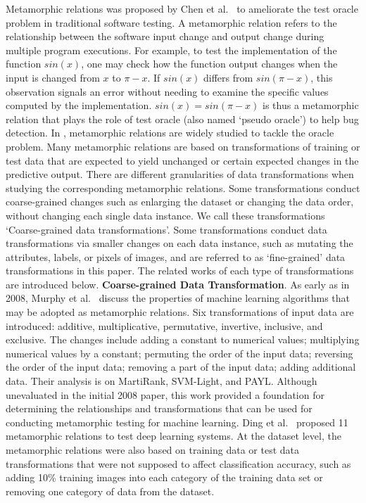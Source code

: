 \label{sec:metamorphicrelations}
Metamorphic relations was proposed by Chen et al.~ to ameliorate the test oracle problem in traditional software testing.
A metamorphic relation refers to the relationship between the software input change and output change during multiple program executions.
For example, to test the implementation of the function $sin(x)$, one may check how the function output changes when the input is changed from $x$ to $\pi -x$. 
If $sin(x)$ differs from $sin(\pi - x)$, this observation signals an error without needing to examine the specific values computed by the implementation.
$sin(x) = sin(\pi - x)$ is thus a metamorphic relation that plays the role of test oracle (also named `pseudo oracle') to help bug detection.
In \mlt{}, metamorphic relations are widely studied to tackle the oracle problem.
Many metamorphic relations are based on transformations of training or test data that are expected to yield unchanged or certain expected changes in the predictive output.
There are different granularities of data transformations when studying the corresponding metamorphic relations.
Some transformations conduct coarse-grained changes such as enlarging the dataset or changing the data order, without changing each single data instance. 
We call these transformations `Coarse-grained data transformations'.
Some transformations conduct data transformations via smaller changes on each data instance, such as mutating the attributes, labels, or pixels of images, and are referred to as `fine-grained' data transformations in this paper.
The related works of each type of transformations are introduced below.
\noindent \textbf{Coarse-grained Data Transformation}.
As early as in 2008, Murphy et al.~ discuss the properties of machine learning algorithms that may be adopted as metamorphic relations.
Six transformations of input data are introduced: additive, multiplicative, permutative, invertive,
inclusive, and exclusive.
The changes include adding a constant to numerical values; 
multiplying numerical values by a constant; 
permuting the order of the input data; 
reversing the order of the input data; 
removing a part of the input data; 
adding additional data.
Their analysis is on MartiRank, SVM-Light, and PAYL.
Although unevaluated in the initial 2008 paper, this work provided a foundation for determining the relationships and transformations that can be used for conducting metamorphic testing for machine learning.
Ding et al.~ proposed 11 metamorphic relations to test deep learning systems.
At the dataset level, the metamorphic relations were also based on training data or test data transformations that were not supposed to affect classification accuracy, such as adding 10\% training images into each category of the training data set or removing one category of data from the dataset.
